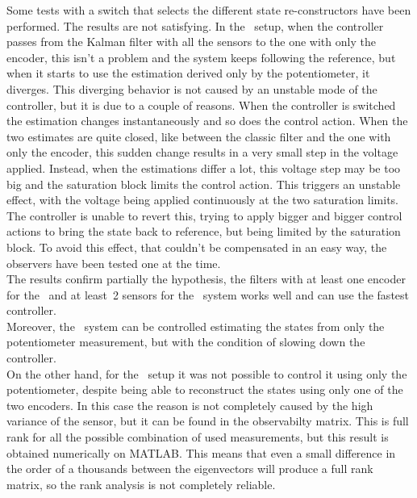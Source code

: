 Some tests with a switch that selects the different state re-constructors have been performed. The results are not satisfying. In the \onedof\ setup, when the controller passes from the Kalman filter with all the sensors to the one with only the encoder, this isn't a problem and the system keeps following the reference, but when it starts to use the estimation derived only by the potentiometer, it diverges. This diverging behavior is not caused by an unstable mode of the controller, but it is due to a couple of reasons. When the controller is switched the estimation changes instantaneously and so does the control action. When the two estimates are quite closed, like between the classic filter and the one with only the encoder, this sudden change results in a very small step in the voltage applied. Instead, when the estimations differ a lot, this voltage step may be too big and the saturation block limits the control action. This triggers an unstable effect, with the voltage being applied continuously at the two saturation limits. The controller is unable to revert this, trying to apply bigger and bigger control actions to bring the state back to reference, but being limited by the saturation block. To avoid this effect, that couldn't be compensated in an easy way, the observers have been tested one at the time. \\

The results confirm partially the hypothesis, the filters with at least one encoder for the \onedof\ and at least~2 sensors for the \twodof\ system works well and can use the fastest controller.\\
Moreover, the \onedof\ system can be controlled estimating the states from only the potentiometer measurement, but with the condition of slowing down the controller.\\

On the other hand, for the \twodof\ setup it was not possible to control it using only the potentiometer, despite being able to reconstruct the states using only one of the two encoders.
In this case the reason is not completely caused by the high variance of the sensor, but it can be found in the observabilty matrix. This is full rank for all the possible combination of used measurements, but this result is obtained numerically on MATLAB. This means that even a small difference in the order of a thousands between the eigenvectors will produce a full rank matrix, so the rank analysis is not completely reliable. \\ 

